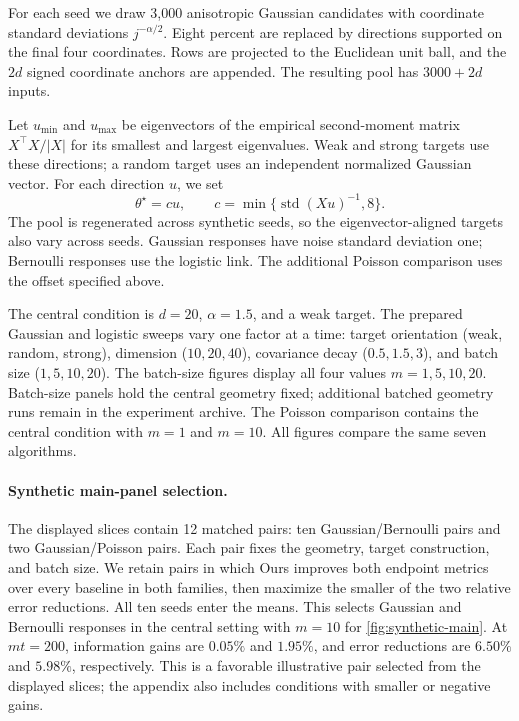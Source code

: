 \documentclass[10pt,twoside,letterpaper]{article}
\begin{document}
For each seed we draw 3,000 anisotropic Gaussian candidates with
coordinate standard deviations $j^{-\alpha/2}$. Eight percent are
replaced by directions supported on the final four coordinates. Rows
are projected to the Euclidean unit ball, and the $2d$ signed coordinate
anchors are appended. The resulting pool has $3000+2d$ inputs.

Let $u_{\min}$ and $u_{\max}$ be eigenvectors of the empirical second-moment
matrix $X^\top X/|X|$ for its smallest and largest eigenvalues.
Weak and strong targets use these directions;
a random target uses an independent normalized Gaussian vector. For
each direction $u$, we set
\begin{equation}
  \theta^\star=cu,\qquad
  c=\min\{\operatorname{std}(Xu)^{-1},8\}.
  \label{eq:experimental-target}
\end{equation}
The pool is regenerated across synthetic seeds, so the eigenvector-aligned
targets also vary across seeds. Gaussian responses have noise standard
deviation one; Bernoulli responses use the logistic link. The additional
Poisson comparison uses the offset specified above.

The central condition is $d=20$, $\alpha=1.5$, and a weak target.
The prepared Gaussian and logistic sweeps vary one factor at a time:
target orientation (weak, random, strong), dimension ($10,20,40$),
covariance decay ($0.5,1.5,3$), and batch size ($1,5,10,20$).
The batch-size figures display all four values $m=1,5,10,20$.
Batch-size panels hold the central geometry fixed; additional batched
geometry runs remain in the experiment archive.
The Poisson comparison contains the central condition with $m=1$ and
$m=10$. All figures compare the same seven algorithms.

\paragraph{Synthetic main-panel selection.}
The displayed slices contain 12 matched pairs: ten Gaussian/Bernoulli
pairs and two Gaussian/Poisson pairs. Each pair fixes the geometry,
target construction, and batch size. We retain pairs in which Ours
improves both endpoint metrics over every baseline in both families,
then maximize the smaller of the two relative error reductions.
All ten seeds enter the means. This selects Gaussian and Bernoulli
responses in the central setting with $m=10$ for
\cref{fig:synthetic-main}. At $mt=200$, information gains are $0.05\%$
and $1.95\%$, and error reductions are $6.50\%$ and $5.98\%$,
respectively. This is a favorable illustrative pair selected from the
displayed slices; the appendix also includes conditions with smaller
or negative gains.
\end{document}

